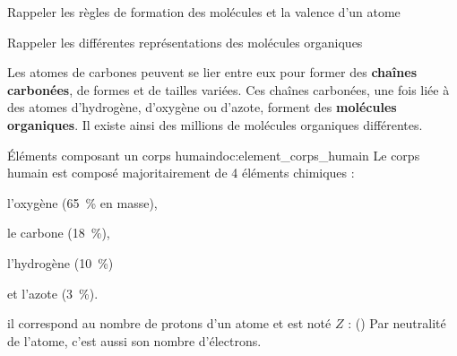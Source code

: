 \teteTermStssOrga

\vspace*{-30pt}

\begin{objectifs}
  \item Rappeler les règles de formation des molécules et la valence d'un atome
  \item Rappeler les différentes représentations des molécules organiques
\end{objectifs}

\begin{contexte}
  Les atomes de carbones peuvent se lier entre eux pour former des \textbf{chaînes carbonées}, de formes et de tailles variées.
  Ces chaînes carbonées, une fois liée à des atomes d'hydrogène, d'oxygène ou d'azote, forment des \textbf{molécules organiques}.
  Il existe ainsi des millions de molécules organiques différentes.

\end{contexte}


\vspace*{-8pt}
\vspace*{-8pt}

\begin{doc}{Éléments composant un corps humain}{doc:element_corps_humain}
  Le corps humain est composé majoritairement de 4 éléments chimiques :
  \vspace*{-4pt}
  \begin{multicols}{2}
  \begin{listePoints}
    \item l'oxygène    (\qty{65}{\percent} en masse),
    \item le carbone   (\qty{18}{\percent}),
    \item l'hydrogène  (\qty{10}{\percent})
    \item et l'azote   (\qty{3}{\percent}).
  \end{listePoints}
  \end{multicols}
  
  \begin{encart}
     il correspond au nombre de protons d'un atome et est noté $Z$ :  (\hspace{-8pt}\exemple {})
    Par neutralité de l'atome, c'est aussi son nombre d'électrons.
  \end{encart}
\end{doc}

